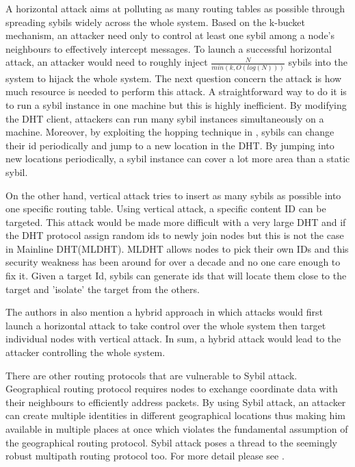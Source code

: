 \documentclass[conference]{IEEEtran}
\begin{document}
A horizontal attack aims at polluting as many routing tables as possible through spreading sybils widely across the whole system. 
Based on the k-bucket mechanism, an attacker need only to control at least one sybil among a node's neighbours to effectively intercept messages.
To launch a successful horizontal attack, an attacker would need to roughly inject $\frac{N}{min(k,O(log(N)))}$ sybils into the system to hijack the whole system.
The next question concern the attack is how much resource is needed to perform this attack. A straightforward way to do it is to run a sybil instance in one machine
but this is highly inefficient. By modifying the DHT client, attackers can run many sybil instances simultaneously on a machine. Moreover, by exploiting the hopping technique
in \cite{wolchok09defeatingvanish}, sybils can change their id periodically and jump to a new location in the DHT. By jumping into new locations periodically, a sybil instance
can cover a lot more area than a static sybil.

On the other hand, vertical attack tries to insert as many sybils as possible into one specific routing table. Using vertical attack, a specific content ID can be targeted.
This attack would be made more difficult with a very large DHT and if the DHT protocol assign random ids to newly join nodes but this is not the case in Mainline DHT(MLDHT)\cite{wang12dht}.
MLDHT allows nodes to pick their own IDs and this security weakness has been around for over a decade and no one care enough to fix it. 
Given a target Id, sybils can generate ids that will locate them close
to the target and 'isolate' the target from the others.

The authors in \cite{wang12dht} also mention a hybrid approach in which attacks would first launch a horizontal attack to take control over the whole system then target individual nodes
with vertical attack. In sum, a hybrid attack would lead to the attacker controlling the whole system.

There are other routing protocols that are vulnerable to Sybil attack.
Geographical routing protocol requires nodes to exchange coordinate data with their neighbours to efficiently address packets. 
By using Sybil attack, an attacker can create multiple identities in different geographical locations thus making him available in multiple places at once which violates the 
fundamental assumption of the geographical routing protocol\cite{Karlof03securerouting}. 
Sybil attack poses a thread to the seemingly robust multipath routing protocol too. For more detail please see \cite{Karlof03securerouting}.
\end{document}
